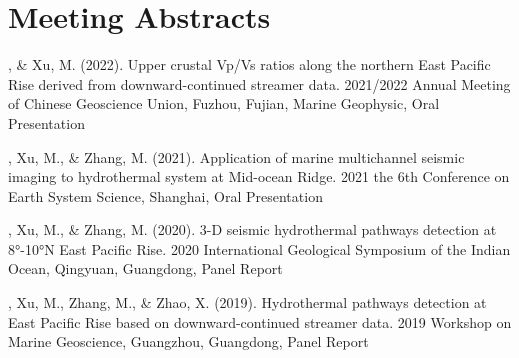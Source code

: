 \section{Meeting Abstracts}

\begin{etaremune}
    \item \Di, \& Xu, M. (2022).
    Upper crustal Vp/Vs ratios along the northern East Pacific Rise derived from downward-continued streamer data.
    2021/2022 Annual Meeting of Chinese Geoscience Union, Fuzhou, Fujian, Marine Geophysic, Oral Presentation
\item \Di, Xu, M., \& Zhang, M. (2021).
Application of marine multichannel seismic imaging to hydrothermal system at Mid-ocean Ridge.
    2021 the 6th Conference on Earth System Science, Shanghai, Oral Presentation
\item \Di, Xu, M., \& Zhang, M. (2020).
    3-D seismic hydrothermal pathways detection at 8°-10°N East Pacific Rise.
    2020 International Geological Symposium of the Indian Ocean, Qingyuan, Guangdong, Panel Report
\item \Di, Xu, M., Zhang, M., \& Zhao, X. (2019).
    Hydrothermal pathways detection at East Pacific Rise based on downward-continued streamer data.
    2019 Workshop on Marine Geoscience, Guangzhou, Guangdong, Panel Report
\end{etaremune}
